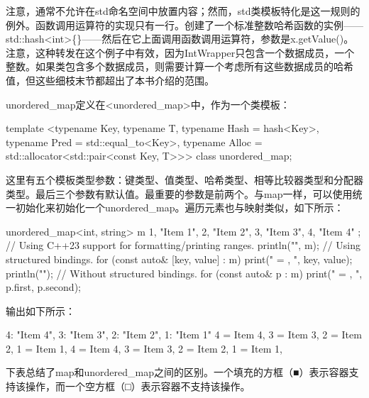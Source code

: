 注意，通常不允许在std命名空间中放置内容；然而，std类模板特化是这一规则的例外。函数调用运算符的实现只有一行。创建了一个标准整数哈希函数的实例——std::hash<int>\{\}——然后在它上面调用函数调用运算符，参数是x.getValue()。注意，这种转发在这个例子中有效，因为IntWrapper只包含一个数据成员，一个整数。如果类包含多个数据成员，则需要计算一个考虑所有这些数据成员的哈希值，但这些细枝末节都超出了本书介绍的范围。


unordered\_map定义在<unordered\_map>中，作为一个类模板：

\begin{cpp}
template <typename Key,
          typename T,
          typename Hash = hash<Key>,
          typename Pred = std::equal_to<Key>,
          typename Alloc = std::allocator<std::pair<const Key, T>>>
    class unordered_map;
\end{cpp}

这里有五个模板类型参数：键类型、值类型、哈希类型、相等比较器类型和分配器类型。最后三个参数有默认值。最重要的参数是前两个。与map一样，可以使用统一初始化来初始化一个unordered\_map。遍历元素也与映射类似，如下所示：

\begin{cpp}
unordered_map<int, string> m {
    {1, "Item 1"}, {2, "Item 2"}, {3, "Item 3"}, {4, "Item 4"}
};
// Using C++23 support for formatting/printing ranges.
println("{}", m);
// Using structured bindings.
for (const auto& [key, value] : m) { print("{} = {}, ", key, value); }
println("");
// Without structured bindings.
for (const auto& p : m) { print("{} = {}, ", p.first, p.second); }
\end{cpp}

输出如下所示：

\begin{shell}
{4: "Item 4", 3: "Item 3", 2: "Item 2", 1: "Item 1"}
4 = Item 4, 3 = Item 3, 2 = Item 2, 1 = Item 1,
4 = Item 4, 3 = Item 3, 2 = Item 2, 1 = Item 1,
\end{shell}

下表总结了map和unordered\_map之间的区别。一个填充的方框（■）表示容器支持该操作，而一个空方框（□）表示容器不支持该操作。

